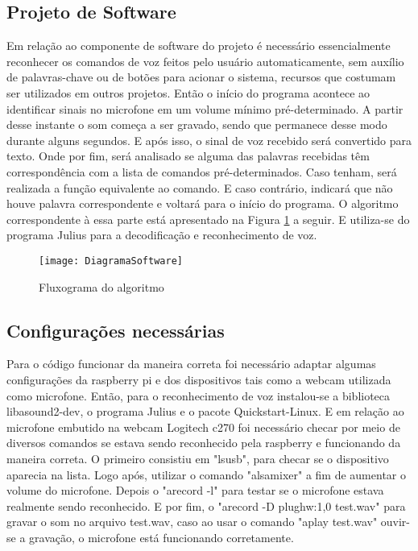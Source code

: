 \subsection{Projeto de Software}

Em relação ao componente de software do projeto é necessário essencialmente reconhecer os comandos de voz feitos pelo usuário automaticamente, sem auxílio de palavras-chave ou de botões para acionar o sistema, recursos que costumam ser utilizados em outros projetos. Então o início do programa acontece ao identificar sinais no microfone em um volume mínimo pré-determinado. 
A partir desse instante o som começa a ser gravado, sendo que permanece desse modo durante alguns segundos. E após isso, o sinal de voz recebido será convertido para texto. Onde por fim, será analisado se alguma das palavras recebidas têm correspondência com a lista de comandos pré-determinados. Caso tenham, será realizada a função equivalente ao comando. E caso contrário, indicará que não houve palavra correspondente e voltará para o início do programa.
O algoritmo correspondente à essa parte está apresentado na Figura \ref{fig-DiagramaSoftware} a seguir. E utiliza-se do programa Julius para a decodificação e reconhecimento de voz.

\begin{figure}[htbp]
	\centering
		\texttt{[image: DiagramaSoftware]}
	\caption{Fluxograma do algoritmo}
	\label{fig-DiagramaSoftware}
\end{figure}

\subsection{Configurações necessárias}

Para o código funcionar da maneira correta foi necessário adaptar algumas configurações da raspberry pi e dos dispositivos tais como a webcam utilizada como microfone.
Então, para o reconhecimento de voz instalou-se a biblioteca libasound2-dev, o programa Julius e o pacote Quickstart-Linux.
E em relação ao microfone embutido na webcam Logitech c270 foi necessário checar por meio de diversos comandos se estava sendo reconhecido pela raspberry e funcionando da maneira correta.
O primeiro consistiu em "lsusb", para checar se o dispositivo aparecia na lista. Logo após,  utilizar o comando "alsamixer" a fim de aumentar o volume do microfone. Depois o "arecord -l" para testar se o microfone estava realmente sendo reconhecido.
E por fim, o "arecord -D plughw:1,0 test.wav" para gravar o som no arquivo test.wav, caso ao usar o comando "aplay test.wav" ouvir-se a gravação, o microfone está funcionando corretamente. 


